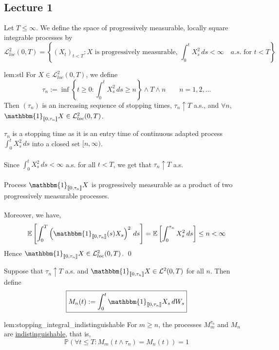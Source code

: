 \documentclass[12pt,a4paper]{article}
\newcommand{\E}{\mathbb{E}}
\renewenvironment{proof}
    {\begin{trivlist}\item[\hskip\labelsep\color{blue}\bfseries Proof:]}
    {\qed\end{trivlist}}
\begin{document}
\subsection{Lecture 1}
\begin{definition}{}{}
    Let $T\le \infty$. We define the space of progressively measurable, locally square integrable processes by
    $$
    \mathcal{L}^2_{loc}(0,T) = \left\{(X_t)_{t<T}: \text{$X$ is progressively measurable, } \int_0^t X_s^2\,ds<\infty \quad a.s.\text{ for $t<T$}\right\}
    $$
\end{definition}
\begin{lemma}{}{lem:stl}
For $X\in\mathcal{L}_{loc}^2(0,T)$, we define
$$
\tau_n:= \inf\left\{t\ge 0: \int_0^t X_s^2\,ds\ge n\right\}\wedge T\wedge n\qquad n=1,2,\ldots
$$
Then $(\tau_n)$ is an increasing sequence of stopping times, $\tau_n\uparrow T$ a.s., and $\forall n$, $\mathbbm{1}_{\llbracket 0, \tau_n \rrbracket}X\in\mathcal{L}_{loc}^2(0,T)$.    
\end{lemma}
\begin{proof}
    $\tau_n$ is a stopping time as it is an entry time of continuous adapted process $\int_0^t X_s^2\, ds$ into a closed set $[n,\infty)$.\\
    \\
    Since $\int_0^t X_s^2\,ds<\infty$ a.s. for all $t<T$, we get that $\tau_n\uparrow T$ a.s.\\
    \\
    Process $\mathbbm{1}_{\llbracket 0, \tau_n \rrbracket}X$ is progressively measurable as a product of two progressively measurable processes.\\
    \\
    Moreover, we have,
    $$
    \E\left[\int_0^T \left(\mathbbm{1}_{\llbracket 0, \tau_n \rrbracket}(s)X_s\right)^2\,ds\right] = \E\left[\int_0^{\tau_n} X_s^2\,ds\right]\le n<\infty
    $$
    Hence $\mathbbm{1}_{\llbracket 0, \tau_n \rrbracket}X\in\mathcal{L}_{loc}^2(0,T)$.
\end{proof}
\pagebreak
Suppose that $\tau_n\uparrow T$ a.s. and $\mathbbm{1}_{\llbracket 0, \tau_n \rrbracket}X\in\mathcal{L}^2(0,T)$ for all $n$. Then define
$$
\boxed{M_n(t):=\int_0^t \mathbbm{1}_{\llbracket 0,\tau_n\rrbracket} X_s\, dW_s}
$$
\begin{lemma}{}{lem:stopping_integral_indistinguishable}
    For $m\ge n$, the processes $M_m^{\tau_n}$ and $M_n$ are \underline{indistinguishable}, that is,
    $$
    \mathbb{P}(\forall t\le T: M_m(t\wedge \tau_n)=M_n(t))=1
    $$
\end{lemma}
\end{document}
